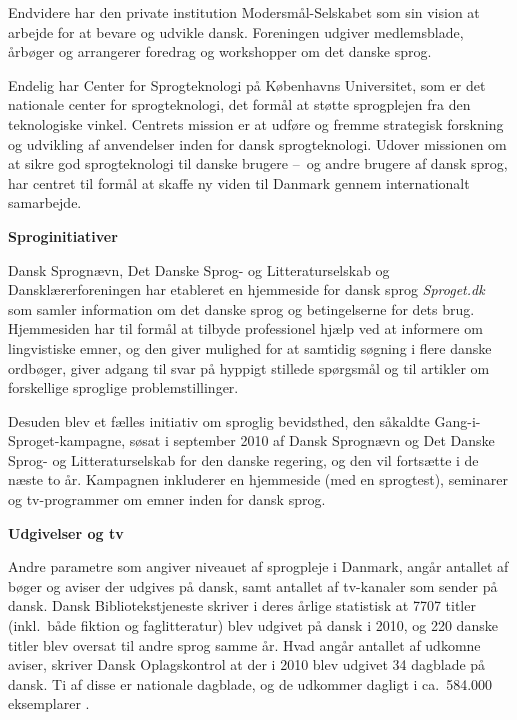 \documentclass[]{../../metanetpaper}
\begin{document}
\begin{multicols}{2}

Endvidere har den private institution Moders\-m\aa l-Selskabet som sin vision at arbejde for at bevare og udvikle dansk. Foreningen udgiver medlemsblade, \aa rb\o ger og arrangerer foredrag og workshopper om det danske sprog.


Endelig har Center for Sprogteknologi \mbox{p\aa} K\o benhavns Universitet, som er det nationale center for sprogteknologi, det form\aa l at st\o tte sprogplejen fra den teknologiske vinkel. Centrets mission er at udf\o re og fremme strategisk forskning og udvikling af anvendelser inden for dansk sprogteknologi. Udover missionen om at sikre god sprogteknologi til danske brugere --~og andre brugere af dansk sprog, har centret til form\aa l at skaffe ny viden til Danmark gennem internationalt samarbejde.

{\bf Sproginitiativer}

Dansk Sprogn\ae vn, Det Danske Sprog- og Litteraturselskab og Danskl\ae rerforeningen har etableret en hjemmeside for dansk sprog {\it Sproget.dk} som samler information om det danske sprog og betingelserne for dets brug. Hjemmesiden har til form\aa l at tilbyde professionel hj\ae lp ved at informere om lingvistiske emner, og den giver mulighed for at samtidig s\o gning i flere danske ordb\o ger, giver adgang til svar \mbox{p\aa} hyppigt stillede sp\o rgsm\aa l og til artikler om forskellige sproglige problemstillinger.

\sloppy
Desuden blev et f\ae lles initiativ om sproglig bevidsthed, den s\aa kaldte Gang-i-Sproget-kampagne, s\o sat i september 2010 af Dansk Sprogn\ae vn og Det Danske Sprog- og Litteraturselskab for den danske regering, og den vil forts\ae tte i de n\ae ste to \aa r. Kampagnen inkluderer en hjemmeside (med en sprogtest), seminarer og tv-programmer om emner inden for dansk sprog.

{\bf Udgivelser og tv}

Andre parametre som angiver niveauet af sprogpleje i Danmark, ang\aa r antallet af b\o ger og aviser der udgives \mbox{p\aa} dansk, samt antallet af tv-kanaler som sender \mbox{p\aa} dansk. Dansk Bibliotekstjeneste skriver i deres \aa rlige statistisk at 7707 titler (inkl.\ b\aa de fiktion og faglitteratur) blev udgivet \mbox{p\aa} dansk i 2010, og 220 danske titler blev oversat til andre sprog samme \aa r. Hvad ang\aa r antallet af udkomne aviser, skriver Dansk Oplagskontrol at der i 2010 blev udgivet 34 dagblade \mbox{p\aa} dansk. Ti af disse er nationale dagblade, og de udkommer dagligt i ca.\ 584.000 eksemplarer \cite{ddo}.


\end{multicols}
\end{document}

